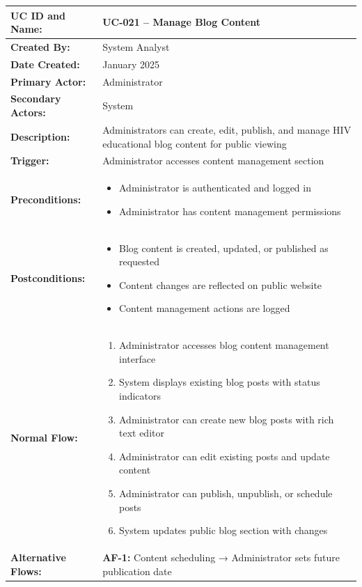 \documentclass[12pt,a4paper]{article}
\begin{document}
\renewcommand{\arraystretch}{1.5}
\begin{longtable}{|p{4.5cm}|p{10.5cm}|}
\hline
\textbf{UC ID and Name:} & UC-021 – Manage Blog Content \\
\hline
\textbf{Created By:} & System Analyst \\
\hline
\textbf{Date Created:} & January 2025 \\
\hline
\textbf{Primary Actor:} & Administrator \\
\hline
\textbf{Secondary Actors:} & System \\
\hline
\textbf{Description:} & Administrators can create, edit, publish, and manage HIV educational blog content for public viewing \\
\hline
\textbf{Trigger:} & Administrator accesses content management section \\
\hline
\textbf{Preconditions:} &
\begin{itemize}
  \item Administrator is authenticated and logged in
  \item Administrator has content management permissions
\end{itemize} \\
\hline
\textbf{Postconditions:} &
\begin{itemize}
  \item Blog content is created, updated, or published as requested
  \item Content changes are reflected on public website
  \item Content management actions are logged
\end{itemize} \\
\hline
\textbf{Normal Flow:} &
\begin{enumerate}
  \item Administrator accesses blog content management interface
  \item System displays existing blog posts with status indicators
  \item Administrator can create new blog posts with rich text editor
  \item Administrator can edit existing posts and update content
  \item Administrator can publish, unpublish, or schedule posts
  \item System updates public blog section with changes
\end{enumerate} \\
\hline
\textbf{Alternative Flows:} &
\textbf{AF-1:} Content scheduling → Administrator sets future publication date \\

\end{longtable}
\end{document}
